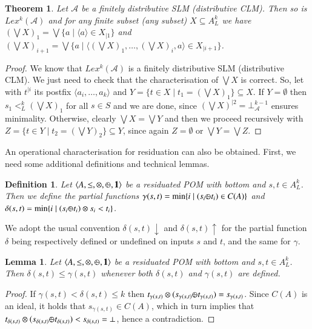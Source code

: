 \documentclass[a4paper]{elsarticle}
\newtheorem{definition}{Definition}
\newtheorem{lemma}{Lemma}
\newtheorem{theorem}{Theorem}
\newcommand{\monop}{\otimes}
\newcommand{\1}{\mathbf{1}}
\def\odiv{{ \ominus\hspace{-8pt}:}\;}
\begin{document}
\begin{theorem}\label{theo:lexiSLM}
	Let $\mathcal{A}$ be a finitely distributive SLM (distributive CLM).
	Then so is $Lex^k(\mathcal{A})$ %
	and for any finite subset (any subset) $X \subseteq A^k_L$ 
         we have $(\bigvee X)_1 = \bigvee \{ a \mid \langle a \rangle \in X_{\mid 1}\}$
         and $(\bigvee X)_{i+1} = \bigvee \{ a \mid \langle (\bigvee X)_1, \ldots, (\bigvee X)_i, a \rangle \in X_{\mid i+1}\}$.
\end{theorem}
\begin{proof}
	We know that $Lex^k(\mathcal{A})$ is a finitely distributive SLM (distributive CLM). We just need to check that
	 the characterisation of $\bigvee X$ is correct. So, let with $t^{\mid i}$ its postfix $\langle a_i, \ldots, a_k \rangle$
	 and $Y = \{ t \in X \mid t_1 = (\bigvee X)_1\} \subseteq X$. 
	If $Y= \emptyset$ then $s_1 <^k_L (\bigvee X)_1$ for all $s \in S$ and we are done,
	since $(\bigvee X)^{\mid 2} = \bot^{k-1}_\mathcal{A}$ ensures minimality.
	Otherwise, clearly $\bigvee X = \bigvee Y$ and then we proceed 
	recursively with  $Z =  \{ t \in Y \mid t_2 = (\bigvee Y)_2\} \subseteq Y$,
	since again $Z = \emptyset$ or $\bigvee Y = \bigvee Z$.
\end{proof}

An operational characterisation for residuation can also be obtained. 
First, we need some additional definitions and technical lemmas.

\begin{definition}
	Let $\langle A, \leq, \monop, \odiv, \1 \rangle$
	be a residuated POM with bottom and $s, t \in A^k_L$. Then 
	we define the partial functions 
	$\gamma(s, t) = \min\{ i \mid (s_i \odiv t_i) \in C(A)\}$
	and $\delta(s, t) = \min\{ i \mid (s_i \odiv t_i) \otimes s_i < t_i\}$.
\end{definition}

We adopt the usual convention $\delta(s,t)\downarrow$ and $\delta(s,t)\uparrow$ for 
the partial function $\delta$ being respectively defined or undefined on inputs $s$ and $t$,
and the same for $\gamma$.


\begin{lemma}\label{limit}
	Let $\langle A, \leq, \monop, \odiv, \1 \rangle$
	be a residuated POM with bottom and $s, t \in A^k_L$. Then 
	$\delta(s,t) \leq \gamma(s,t)$
	whenever both 	$\delta(s,t)$ and $\gamma(s,t)$
	are defined.
\end{lemma}
\begin{proof}
	If $\gamma(s,t) < \delta(s,t) \leq k$ then 
	$t_{\gamma(s,t)} \otimes (s_{\gamma(s,t)} \odiv t_{\gamma(s,t)})  = s_{\gamma(s,t)}$.
	Since $C(A)$ is an ideal, it holds that $s_{\gamma(s,t)} \in C(A)$, 
	which in turn implies that $t_{\delta(s,t)} \otimes (s_{\delta(s,t)} \odiv t_{\delta(s,t)}) < s_{\delta(s,t)} = \bot$,
	hence a contradiction. 
\end{proof}
\end{document}
